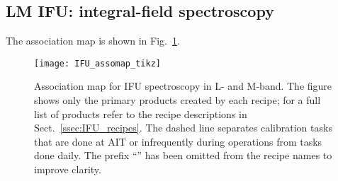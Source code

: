 \subsection{LM IFU: integral-field spectroscopy}
\label{ssec:overview_ifu}

The association map is shown in Fig.~\ref{Fig:IfuAssomap}.


\begin{landscape}
\begin{figure}[ht]
  \centering
  \texttt{[image: IFU\_assomap\_tikz]}
  \caption[Reduction cascade and association map for IFU
  spectroscopy]{%
    Association map for \ac{IFU} spectroscopy in L- and M-band. The
    figure shows only the primary products created by each recipe; for
    a full list of products refer to the recipe descriptions in
    Sect.~\ref{ssec:IFU_recipes}. The dashed line separates
    calibration tasks that are done at AIT or infrequently during
    operations from tasks done daily. The prefix ``'' has been
    omitted from the recipe names to improve clarity.}
  \label{Fig:IfuAssomap}
\end{figure}
\end{landscape}




